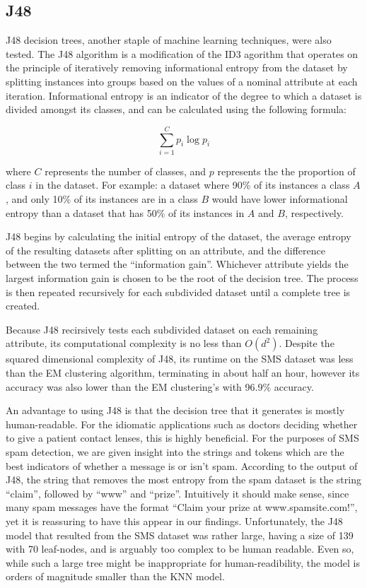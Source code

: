 \documentclass[letterpaper, 10 pt, conference]{ieeeconf}  %
\begin{document}
\subsection{J48}

J48 decision trees, another staple of machine learning techniques,
were also tested. The J48 algorithm is a modification of the ID3
agorithm that operates on the principle of iteratively removing
informational entropy from the dataset by splitting instances into
groups based on the values of a nominal attribute at each
iteration. Informational entropy is an indicator of the degree to
which a dataset is divided amongst its classes, and can be calculated
using the following formula:

\[
\sum_{i=1}^{C} p_i\log{p_i}
\]

where $C$ represents the number of classes, and $p$ represents the the
proportion of class $i$ in the dataset. For example: a dataset where
90\% of its instances a class $A$, and only 10\% of its instances are
in a class $B$ would have lower informational entropy than a dataset
that has 50\% of its instances in $A$ and $B$, respectively.

J48 begins by calculating the initial entropy of the dataset, the
average entropy of the resulting datasets after splitting on an
attribute, and the difference between the two termed the ``information
gain''. Whichever attribute yields the largest information gain is
chosen to be the root of the decision tree. The process is then
repeated recursively for each subdivided dataset until a complete tree
is created.

Because J48 recirsively tests each subdivided dataset on each
remaining attribute, its computational complexity is no less than
$O(d^2)$. Despite the squared dimensional complexity of J48, its
runtime on the SMS dataset was less than the EM clustering algorithm,
terminating in about half an hour, however its accuracy was also lower
than the EM clustering's with 96.9\% accuracy.

An advantage to using J48 is that the decision tree that it generates
is mostly human-readable. For the idiomatic applications such as
doctors deciding whether to give a patient contact lenses, this is
highly beneficial. For the purposes of SMS spam detection, we are
given insight into the strings and tokens which are the best
indicators of whether a message is or isn't spam. According to the
output of J48, the string that removes the most entropy from the spam
dataset is the string ``claim'', followed by ``www'' and
``prize''. Intuitively it should make sense, since many spam messages
have the format ``Claim your prize at www.spamsite.com!'', yet it is
reassuring to have this appear in our findings. Unfortunately, the J48
model that resulted from the SMS dataset was rather large, having a
size of 139 with 70 leaf-nodes, and is arguably too complex to be
human readable. Even so, while such a large tree might be
inappropriate for human-readibility, the model is orders of magnitude
smaller than the KNN model.
\end{document}
